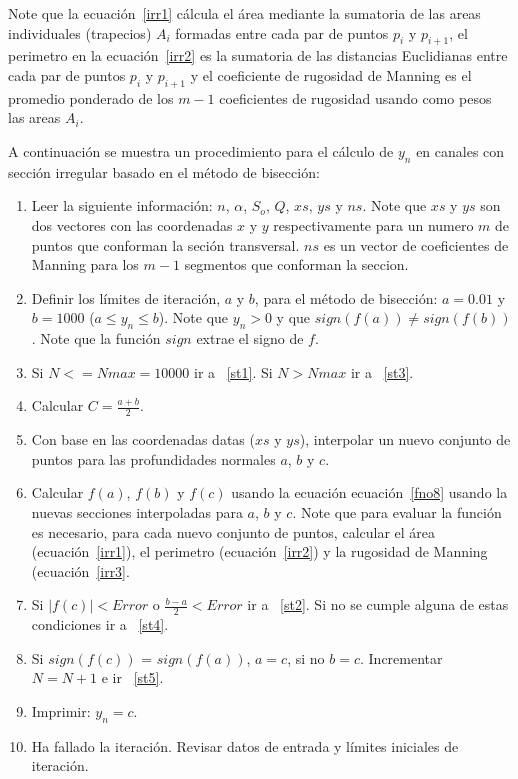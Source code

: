 \documentclass[11pt, oneside]{article}
\begin{document}
Note que la ecuaci\'on~\ref{irr1} c\'alcula el \'area mediante la sumatoria de las areas individuales (trapecios) $A_i$ formadas entre cada par de puntos $p_i$ y $p_{i+1}$, el perimetro en la ecuaci\'on~\ref{irr2} es la sumatoria de las distancias Euclidianas entre cada par de puntos $p_i$ y $p_{i+1}$ y el coeficiente de rugosidad de Manning es el promedio ponderado de los $m-1$ coeficientes de rugosidad usando como pesos las areas $A_i$.

A continuaci\'on se muestra un procedimiento para el c\'alculo de $y_n$ en canales con secci\'on irregular basado en el m\'etodo de bisecci\'on:
\begin{enumerate}
\item Leer la siguiente informaci\'on: $n$, $\alpha$, $S_o$, $Q$, $xs$, $ys$ y $ns$. Note que $xs$ y $ys$ son dos vectores con las coordenadas $x$ y $y$ respectivamente para un numero $m$ de puntos que conforman la seci\'on transversal. $ns$ es un vector de coeficientes de Manning para los $m-1$ segmentos que conforman la seccion.

\item Definir los l\'imites de iteraci\'on, $a$ y $b$, para el m\'etodo de bisecci\'on: $a = 0.01$ y $b=1000$ ($a \le y_n \le b$). Note que $y_n > 0$ y que $sign(f(a)) \neq sign(f(b)) $. Note que la funci\'on $sign$ extrae el signo de $f$.

\item \label{st5} Si $N <= Nmax=10000$ ir a ~\ref{st1}. Si $N > Nmax$ ir a ~\ref{st3}.  
\item \label{st1} Calcular $C = \frac{a+b}{2}$.
\item Con base en las coordenadas datas ($xs$ y $ys$), interpolar un nuevo conjunto de puntos para las profundidades normales $a$, $b$ y $c$.   
\item Calcular $f(a)$, $f(b)$ y $f(c)$ usando la ecuaci\'on ecuaci\'on~\ref{fno8} usando la nuevas secciones interpoladas para $a$, $b$ y $c$. Note que para evaluar la funci\'on es necesario, para cada nuevo conjunto de puntos, calcular el \'area (ecuaci\'on~\ref{irr1}), el perimetro (ecuaci\'on~\ref{irr2}) y la rugosidad de Manning (ecuaci\'on~\ref{irr3}.
\item Si $|f(c)|< Error$ o $\frac{b-a}{2} < Error$ ir a ~\ref{st2}. Si no se cumple alguna de estas  condiciones ir a ~\ref{st4}.

\item \label{st4} Si $sign(f(c))$ = $sign(f(a))$, $a=c$, si no $b=c$. Incrementar $N=N+1$ e ir ~\ref{st5}. 

\item \label{st2} Imprimir: $y_n = c$.
\item \label{st3} Ha fallado la iteraci\'on. Revisar datos de entrada y l\'imites iniciales de iteraci\'on.
\end{enumerate}



\end{document}
